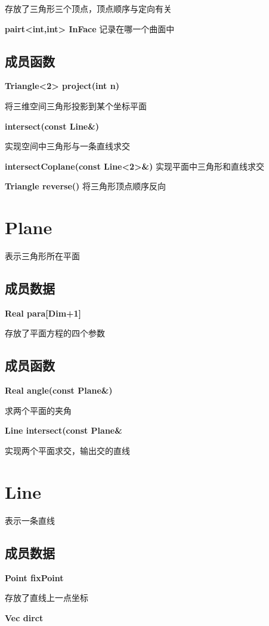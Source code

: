 \documentclass[UTF8]{ctexart}
\begin{document}
	存放了三角形三个顶点，顶点顺序与定向有关
	
\textbf{pairt<int,int> InFace}
	记录在哪一个曲面中
	
	\subsection{成员函数}
	\textbf{Triangle<2> project(int n)}
	
	将三维空间三角形投影到某个坐标平面
	
	\textbf{intersect(const Line\&)}
	
	实现空间中三角形与一条直线求交
	
	\textbf{intersectCoplane(const Line<2>\&)}
	实现平面中三角形和直线求交
	
	\textbf{Triangle reverse()}
	将三角形顶点顺序反向
	
	
	\section{Plane}
	表示三角形所在平面
	
	
	\subsection{成员数据}
	\textbf{Real para[Dim+1]}
	
	存放了平面方程的四个参数
	
	
	
	\subsection{成员函数}
	\textbf{ Real angle(const Plane\&)}
	
	求两个平面的夹角
	
	\textbf{Line intersect(const Plane\&}
	
	实现两个平面求交，输出交的直线
	
	
	\section{Line}
	表示一条直线
	
	
	\subsection{成员数据}
	\textbf{Point fixPoint}
	
	存放了直线上一点坐标
	
	\textbf{Vec dirct}
	
\end{document}
